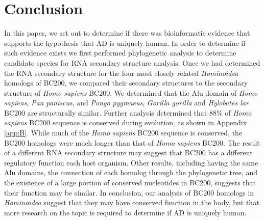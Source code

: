 \documentclass[conference, 11pt]{IEEEtran}
\begin{document}
\section{Conclusion}\label{sec:conclusion}

In this paper, we set out to determine if there was bioinformatic evidence that supports the hypothesis that AD is uniquely human. 
In order to determine if such evidence exists we first performed phylogenetic analysis to determine candidate species for RNA secondary structure analysis. 
Once we had determined the RNA secondary structure for the four most closely related \emph{Hominoidea} homologs of BC200, we compared their secondary structures to the secondary structure of \emph{Homo sapiens} BC200. 
We determined that the Alu domain of \emph{Homo sapiens}, \emph{Pan paniscus}, and \emph{Pongo pygmaeus}, \emph{Gorilla gorilla} and \emph{Hylobates lar} BC200 are structurally similar. 
Further analysis determined that 88\% of \emph{Homo sapiens} BC200 sequence is conserved during evolution, as shown in Appendix \ref{app:B}. 
While much of the \emph{Homo sapiens} BC200 sequence is conserved, the BC200 homologs were much longer than that of \emph{Homo sapiens} BC200.
The result of a different RNA secondary structure may suggest that BC200 has a different regulatory function each host organism.
Other results, including having the same Alu domains, the connection of each homolog through the phylogenetic tree, and the existence of a large portion of conserved nucleotides in BC200, suggests that their function may be similar. 
In conclusion, our analysis of BC200 homologs in \emph{Hominoidea} suggest that they may have conserved function in the body, but that more research on the topic is required to determine if AD is uniquely human.




\vspace{4cm}

\onecolumn
\appendices
\end{document}
